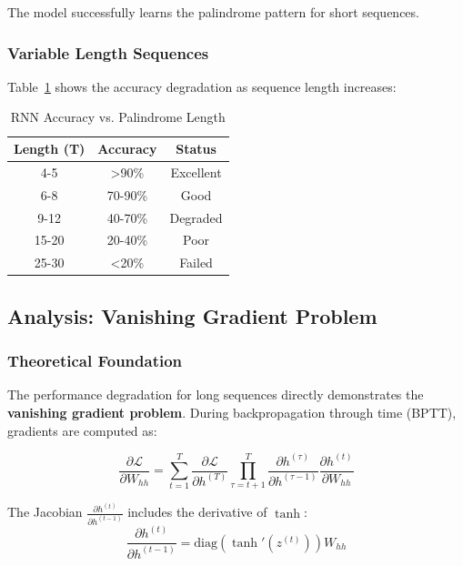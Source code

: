\documentclass[11pt,a4paper]{article}
\begin{document}
The model successfully learns the palindrome pattern for short sequences.

\subsubsection{Variable Length Sequences}

Table~\ref{tab:rnn_results} shows the accuracy degradation as sequence length increases:

\begin{table}[H]
\centering
\caption{RNN Accuracy vs. Palindrome Length}
\label{tab:rnn_results}
\begin{tabular}{@{}ccc@{}}
\toprule
Length (T) & Accuracy & Status \\ \midrule
4-5 & >90\% & Excellent \\
6-8 & 70-90\% & Good \\
9-12 & 40-70\% & Degraded \\
15-20 & 20-40\% & Poor \\
25-30 & <20\% & Failed \\ \bottomrule
\end{tabular}
\end{table}

\subsection{Analysis: Vanishing Gradient Problem}

\subsubsection{Theoretical Foundation}

The performance degradation for long sequences directly demonstrates the \textbf{vanishing gradient problem}. During backpropagation through time (BPTT), gradients are computed as:

\begin{equation}
    \frac{\partial \mathcal{L}}{\partial W_{hh}} = \sum_{t=1}^{T} \frac{\partial \mathcal{L}}{\partial h^{(T)}} \prod_{\tau=t+1}^{T} \frac{\partial h^{(\tau)}}{\partial h^{(\tau-1)}} \frac{\partial h^{(t)}}{\partial W_{hh}}
\end{equation}

The Jacobian $\frac{\partial h^{(t)}}{\partial h^{(t-1)}}$ includes the derivative of $\tanh$:
\begin{equation}
    \frac{\partial h^{(t)}}{\partial h^{(t-1)}} = \text{diag}(\tanh'(z^{(t)})) W_{hh}
\end{equation}
\end{document}
